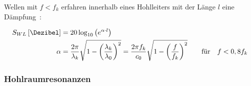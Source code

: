 \par
\vspace{\linespace}
Wellen mit $f < f_k$ erfahren innerhalb eines Hohlleiters mit der Länge $l$ eine Dämpfung~\cite{EM_Schirmung}:

\begin{align}
    S_{WL} \left[\si{\Dezibel}\right] &= 20\log_{10}\left(e^{\alpha\cdot l}\right)  \\
    \alpha &= \frac{2\pi}{\lambda_k} \sqrt{1-\left(\frac{\lambda_k}{\lambda_0}\right)^2} = \frac{2\pi f_k}{c_0} \sqrt{1-\left(\frac{f}{f_k}\right)^2} \qquad \text{für} \quad f < 0,8 f_k
\end{align}


\subsubsection{Hohlraumresonanzen}\label{cha:2_subsub_Hohlraumresonanzen}




